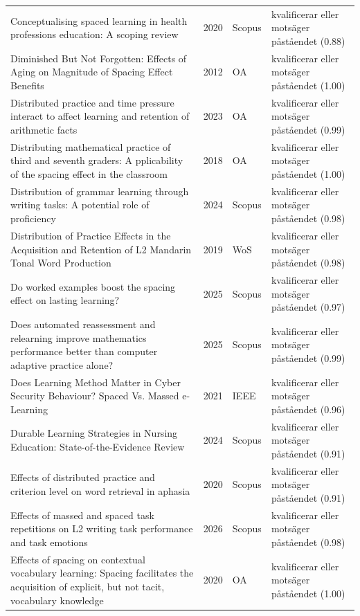 \begin{longtable}{@{}%
  >{\raggedright\arraybackslash}p{}c%
  >{\raggedright\arraybackslash}p{}%
  >{\raggedright\arraybackslash}p{}@{}}
Conceptualising spaced learning in health professions education: A scoping review & 2020 & Scopus & kvalificerar eller motsäger påståendet (0.88) \\
Diminished But Not Forgotten: Effects of Aging on Magnitude of Spacing Effect Benefits & 2012 & OA & kvalificerar eller motsäger påståendet (1.00) \\
Distributed practice and time pressure interact to affect learning and retention of arithmetic facts & 2023 & OA & kvalificerar eller motsäger påståendet (0.99) \\
Distributing mathematical practice of third and seventh graders: A pplicability of the spacing effect in the classroom & 2018 & OA & kvalificerar eller motsäger påståendet (1.00) \\
Distribution of grammar learning through writing tasks: A potential role of proficiency & 2024 & Scopus & kvalificerar eller motsäger påståendet (0.98) \\
Distribution of Practice Effects in the Acquisition and Retention of L2 Mandarin Tonal Word Production & 2019 & WoS & kvalificerar eller motsäger påståendet (0.98) \\
Do worked examples boost the spacing effect on lasting learning? & 2025 & Scopus & kvalificerar eller motsäger påståendet (0.97) \\
Does automated reassessment and relearning improve mathematics performance better than computer adaptive practice alone? & 2025 & Scopus & kvalificerar eller motsäger påståendet (0.99) \\
Does Learning Method Matter in Cyber Security Behaviour? Spaced Vs. Massed e-Learning & 2021 & IEEE & kvalificerar eller motsäger påståendet (0.96) \\
Durable Learning Strategies in Nursing Education: State-of-the-Evidence Review & 2024 & Scopus & kvalificerar eller motsäger påståendet (0.91) \\
Effects of distributed practice and criterion level on word retrieval in aphasia & 2020 & Scopus & kvalificerar eller motsäger påståendet (0.91) \\
Effects of massed and spaced task repetitions on L2 writing task performance and task emotions & 2026 & Scopus & kvalificerar eller motsäger påståendet (0.98) \\
Effects of spacing on contextual vocabulary learning: Spacing facilitates the acquisition of explicit, but not tacit, vocabulary knowledge & 2020 & OA & kvalificerar eller motsäger påståendet (1.00) \\

\end{longtable}
